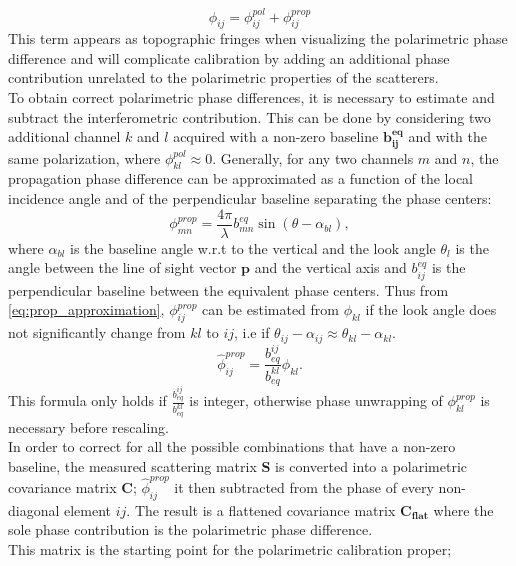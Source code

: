 \begin{equation}
	\phi_{ij} = \phi_{ij}^{pol} + \phi_{ij}^{prop}
\end{equation}
This term appears as topographic fringes when visualizing the polarimetric phase difference and will complicate calibration by adding an additional phase contribution unrelated to the polarimetric properties of the scatterers.\\
To obtain correct polarimetric phase differences, it is necessary to estimate and subtract the interferometric contribution. This can be done  by considering two additional channel $k$ and $l$  acquired with  a non-zero baseline $\mathbf{b_{ij}^{eq}}$ and with the same polarization, where $\phi_{kl}^{pol} \approx 0$. Generally, for any two channels $m$ and $n$,  the propagation phase difference can be approximated as a function of the local incidence angle and of the perpendicular baseline separating the phase centers:
\begin{equation}\label{eq:prop_approximation}
		\phi_{mn}^{prop} = \frac{4\pi}{\lambda} b_{mn}^{eq} \sin(\theta - \alpha_{bl}),
\end{equation}
where $\alpha_{bl}$ is the baseline angle w.r.t to the vertical and the look angle $\theta_l$ is the angle between the line of sight vector $\mathbf{p}$ and the vertical axis and $b_{ij}^{eq}$ is the perpendicular baseline between the equivalent phase centers.
Thus from \autoref{eq:prop_approximation}, $\phi_{ij}^{prop}$ can be estimated from $\phi_{kl}$ if the look angle does not significantly change from $kl$ to $ij$, i.e if $\theta_{ij} - \alpha_{ij} \approx \theta_{kl} - \alpha_{kl}$. 
\begin{equation}
	\hat{\phi}_{ij}^{prop} = \frac{b_{eq}^{ij}}{b_{eq}^{kl}} \phi_{kl}.
\end{equation}
This formula only holds if $\frac{b_{eq}^{ij}}{b_{eq}^{kl}}$ is integer\cite{Massonnet1996}, otherwise phase unwrapping of $\phi_{kl}^{prop}$ is necessary before rescaling.\\
In order to correct for all the possible combinations that have a non-zero baseline, the measured scattering matrix $\mathbf{S}$ is converted into a polarimetric covariance matrix $\mathbf{C}$;  $\hat{\phi}_{ij}^{prop}$ it then subtracted from the phase of every non-diagonal element $ij$. The result is a flattened covariance matrix $\mathbf{C_{flat}}$ where the sole phase contribution is the polarimetric phase difference.\\
This matrix is the starting point for the polarimetric calibration proper;
